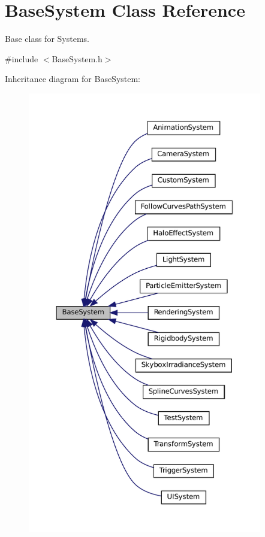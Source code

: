 \hypertarget{classBaseSystem}{}\section{Base\+System Class Reference}
\label{classBaseSystem}


Base class for Systems.  




{\ttfamily \#include $<$Base\+System.\+h$>$}



Inheritance diagram for Base\+System\+:
\nopagebreak
\begin{figure}[H]
\begin{center}
\leavevmode
\includegraphics[height=550pt]{classBaseSystem__inherit__graph}
\end{center}
\end{figure}
